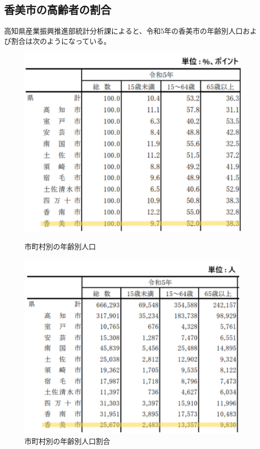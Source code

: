 \subsection{香美市の高齢者の割合}
高知県産業振興推進部統計分析課によると、令和5年の香美市の年齢別人口および割合は次のようになっている。

\begin{figure}[h]
  \centering
  \begin{minipage}{0.43\columnwidth}
    \centering
    \includegraphics[width=\columnwidth]{population_rate.pdf}
    \caption{市町村別の年齢別人口}
    \label{fig:サンプルA}
  \end{minipage}
  \hspace{5mm}
  \begin{minipage}{0.43\columnwidth}
    \centering
    \includegraphics[width=\columnwidth]{population.pdf}
    \caption{市町村別の年齢別人口割合}
    \label{fig:サンプルB}
  \end{minipage}
\end{figure}

